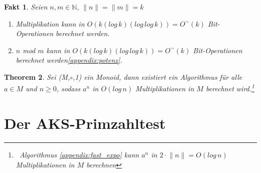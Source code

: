 \documentclass[12pt,oneside]{article}
\newtheorem{theorem}{Theorem}[section]
\newtheorem{fact}[theorem]{Fakt}
\theoremstyle{remark}
\theoremstyle{definition}
\begin{document}
\begin{fact}\label{fact_2}
Seien $n,m \in \mathbb{N}, \, \lVert n \rVert = \lVert m \rVert =k$
\begin{enumerate}
    \item Multiplikation kann in $O(k (log \, k)(log \, log \, k)) = O^{\sim}(k)$ Bit-Operationen berechnet werden.\newline
    \item $n$ mod $m$ kann in $O(k (log \, k)(log \, log \, k)) = O^{\sim}(k)$ Bit-Operationen berechnet werden\ref{appendix:potenz}.\newline
\end{enumerate}
\end{fact}
\begin{theorem}\label{poly_mult}
Sei (M,$\circ$,1) ein Monoid, dann existiert ein Algorithmus für alle $a \in  M$ und $n \geq 0$, sodass $a^n$ in $O(log \, n)$ Multiplikationen in $M$ berechnet wird.\footnote{$\,$ Algorithmus \ref{appendix:fast_expo} kann $a^n$ in $2\cdot \lVert n \rVert = O(log \, n)$ Multiplikationen in $M$ berechnen}
\end{theorem}


\newpage

\section{Der AKS-Primzahltest}
\end{document}
